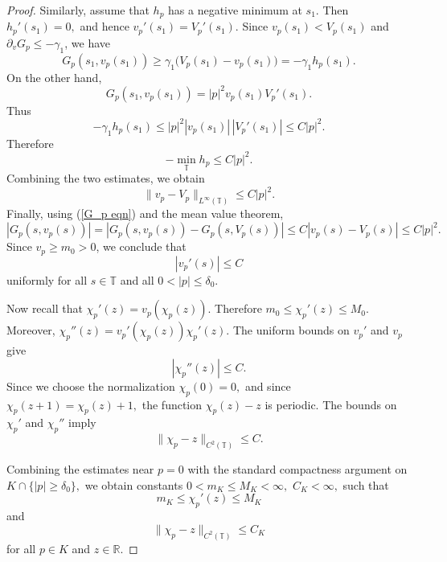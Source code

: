 \documentclass[preprint]{elsarticle}
\numberwithin{equation}{section}
\begin{document}
\begin{proof}
Similarly, assume that $h_p$ has a negative minimum at $s_1$. Then
$
h_p'(s_1)=0,
$
and hence
$
v_p'(s_1)=V_p'(s_1).
$
Since $v_p(s_1)<V_p(s_1)$ and $\partial_vG_p\le-\gamma_1$, we have
\begin{equation*}
G_p(s_1,v_p(s_1))
\ge
\gamma_1\bigl(V_p(s_1)-v_p(s_1)\bigr)
=
-\gamma_1 h_p(s_1).
\end{equation*}
On the other hand,
\begin{equation*}
G_p(s_1,v_p(s_1))
=
|p|^2v_p(s_1)V_p'(s_1).
\end{equation*}
Thus
\begin{equation*}
-\gamma_1 h_p(s_1)
\le
|p|^2|v_p(s_1)|\,|V_p'(s_1)|
\le C|p|^2.
\end{equation*}
Therefore
\begin{equation*}
-\min_{\mathbb T}h_p\le C|p|^2.
\end{equation*}
Combining the two estimates, we obtain
\begin{equation*}
\|v_p-V_p\|_{L^\infty(\mathbb T)}\le C|p|^2.
\end{equation*}
Finally, using (\ref{G_p eqn}) and the mean value theorem,
\begin{equation*}
|G_p(s,v_p(s))|
=
|G_p(s,v_p(s))-G_p(s,V_p(s))|
\le
C|v_p(s)-V_p(s)|
\le C|p|^2.
\end{equation*}
Since $v_p\ge m_0>0$, we conclude that
\begin{equation*}
|v_p'(s)|\le C
\end{equation*}
uniformly for all $s\in\mathbb T$ and all $0<|p|\le\delta_0$.

Now recall that $\chi_p'(z)=v_p(\chi_p(z)).$
Therefore $m_0\le \chi_p'(z)\le M_0.$
Moreover, $\chi_p''(z)
=
v_p'(\chi_p(z))\chi_p'(z).$
The uniform bounds on $v_p'$ and $v_p$ give
\begin{equation*}
|\chi_p''(z)|\le C.
\end{equation*}
Since we choose the normalization
$
\chi_p(0)=0,
$
and since
$
\chi_p(z+1)=\chi_p(z)+1,
$
the function $\chi_p(z)-z$ is periodic. The bounds on $\chi_p'$ and $\chi_p''$ imply
\begin{equation*}
\|\chi_p-z\|_{C^2(\mathbb T)}\le C.
\end{equation*}

Combining the estimates near $p=0$ with the standard compactness argument on
$
K\cap\{|p|\ge\delta_0\},
$
we obtain constants
$
0<m_K\le M_K<\infty,
$
$
C_K<\infty,
$
such that
\begin{equation*}
m_K\le \chi_p'(z)\le M_K
\end{equation*}
and
\begin{equation*}
\|\chi_p-z\|_{C^2(\mathbb T)}\le C_K
\end{equation*}
for all $p\in K$ and $z\in\mathbb R$.
\end{proof}
\end{document}
